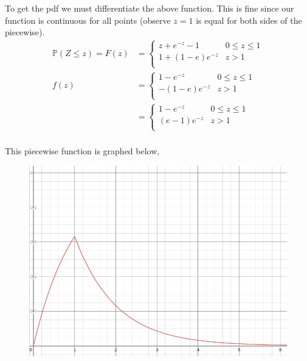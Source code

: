 \documentclass{article}
\newcommand{\prob}{\mathbb{P}}
\begin{document}
To get the pdf we must differentiate the above function. This is fine since
our function is continuous for all points (observe $z=1$ is equal for both
sides of the piecewise).
\begin{align*}
    \prob(Z \leq z) = F(z)
    &=
    \begin{cases}
        z + e^{-z} - 1 & 0 \leq z \leq 1 \\
        1 + (1 - e)e^{-z} & z > 1 \\
    \end{cases} \\
    f(z) &=
    \begin{cases}
        1 - e^{-z} & 0 \leq z \leq 1 \\
        - (1 - e)e^{-z} & z > 1 \\
    \end{cases} \\
    &=
    \begin{cases}
        1 - e^{-z} & 0 \leq z \leq 1 \\
        (e - 1)e^{-z} & z > 1 \\
    \end{cases} \\
\end{align*}

This piecewise function is graphed below,
\begin{figure}[H]
    \centering
    \includegraphics[width=5in]{graph.jpg}
\end{figure}
\end{document}
